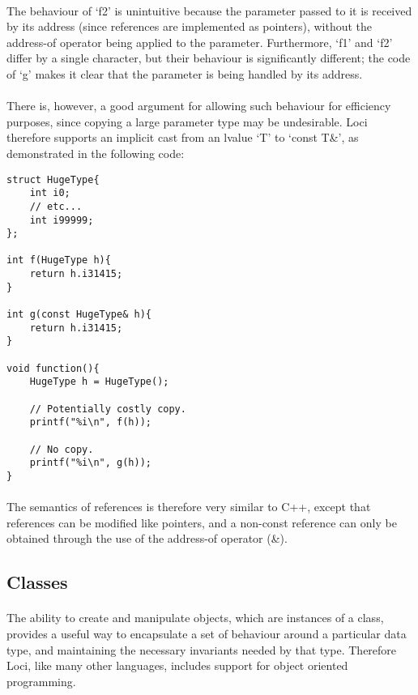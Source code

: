 \documentclass[12pt,twoside,notitlepage]{report}
\begin{document}
\paragraph{}
The behaviour of `f2' is unintuitive because the parameter passed to it is received by its address (since references are implemented as pointers), without the address-of operator being applied to the parameter. Furthermore, `f1' and `f2' differ by a single character, but their behaviour is significantly different; the code of `g' makes it clear that the parameter is being handled by its address.

\paragraph{}
There is, however, a good argument for allowing such behaviour for efficiency purposes, since copying a large parameter type may be undesirable. Loci therefore supports an implicit cast from an lvalue `T' to `const T\&', as demonstrated in the following code:

\small{
\begin{verbatim}
struct HugeType{
    int i0;
    // etc...
    int i99999;
};

int f(HugeType h){
    return h.i31415;
}

int g(const HugeType& h){
    return h.i31415;
}

void function(){
    HugeType h = HugeType();
    
    // Potentially costly copy.
    printf("%i\n", f(h));
    
    // No copy.
    printf("%i\n", g(h));
}
\end{verbatim}
}

\paragraph{}
The semantics of references is therefore very similar to C++, except that references can be modified like pointers, and a non-const reference can only be obtained through the use of the address-of operator (\&).

\subsection{Classes}

\paragraph{}
The ability to create and manipulate objects, which are instances of a class, provides a useful way to encapsulate a set of behaviour around a particular data type, and maintaining the necessary invariants needed by that type. Therefore Loci, like many other languages, includes support for object oriented programming.
\end{document}
